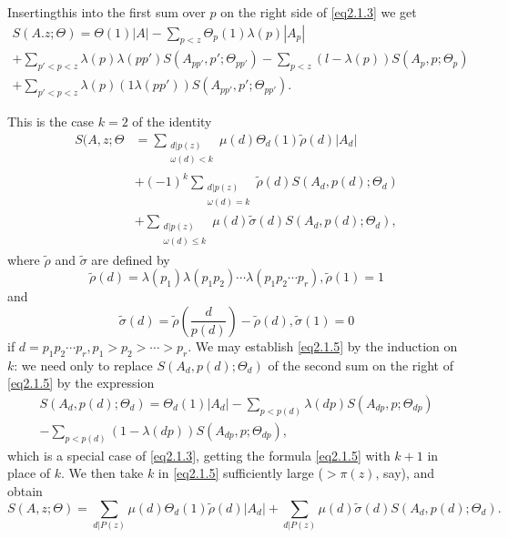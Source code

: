 Inserting\pageoriginale this into the first sum over $p$ on the right side  of
\eqref{eq2.1.3} we get 
\begin{multline*}
  S(A.z; \Theta)= \Theta(1)|A|- \sum_{p <z} \Theta_p(1)\lambda (p)|A_p|\\
  + \sum_{p'< p<z} \lambda(p)\lambda(pp') S(A_{pp'}, p';
  \Theta_{pp'})-  \sum_{p<z} (l- \lambda(p) ) S(A_p, p; \Theta_p)\\ 
  + \sum_{p' < p<z} \lambda(p)(1 \lambda(pp'))S(A_{pp'},
  p';\Theta_{pp'}). 
\end{multline*}

This is the case $k=2$ of the identity
\begin{align*}
  S(A,z;\Theta &= \sum_{\substack{d|p(z) \\ \omega(d) <k}} \mu (d)
  \Theta_d (1) \tilde{\rho}(d) |A_d|\\ 
  & + (-1)^k \sum_{\substack{d|p(z) \\ \omega(d) =k}}
  \tilde{\rho}(d)S(A_d,p(d); \Theta_d) \tag {2.1.5}\label{eq2.1.5}\\ 
  &+ \sum_{\substack{d|p(z)\\ \omega(d) \le k}} \mu (d)
  \tilde{\sigma}(d) S(A_d,p(d); \Theta_d), 
\end{align*}
where $\tilde{\rho}$ and $\tilde{\sigma}$ are defined by 
$$
\tilde{\rho}(d)= \lambda(p_1) \lambda(p_1 p_2) \cdots\lambda(p_1 p_2
\cdots p_r), \tilde{\rho}(1) =1  
$$
and 
$$
\tilde{\sigma}(d) = \tilde{\rho}\left( \frac{d}{p(d)}\right)-\tilde{\rho}(d),
\tilde{\sigma}(1) = 0 
$$
if $d = p_1p_2 \cdots p_r, p_1 > p_2> \cdots > p_r$. We may establish
\eqref{eq2.1.5} by the induction on $k$: we need only to replace
$S(A_d,p(d); \Theta_d)$ of the second sum on the right of \eqref{eq2.1.5} by
the expression  
\begin{multline*}
  S(A_d,p(d); \Theta_d)= \Theta_d(1) |A_d| - \sum_{p< p(d)} \lambda(dp)
  S\left(A_{dp}, p; \Theta_{dp}\right)\\
  - \sum_{p < p (d)} (1 -\lambda(dp)) S\left(A_{dp},
  p; \Theta_{dp}\right), 
\end{multline*}\pageoriginale
which is a special case of \eqref{eq2.1.3}, getting the formula
\eqref{eq2.1.5} 
with $k+1$ in place of $k$. We then take $k$ in \eqref{eq2.1.5} sufficiently
large ($ > \pi (z)$, say), and obtain  
\begin{equation*}
  S(A,z; \Theta)= \sum_{d|P(z)} \mu(d)\Theta_d(1) \tilde{\rho}(d)|A_d|+
  \sum_{d|P(z)} \mu (d) \tilde{\sigma}(d)S(A_d,p(d);
  \Theta_d). \tag{2.1.6} \label{eq2.1.6}
\end{equation*}

